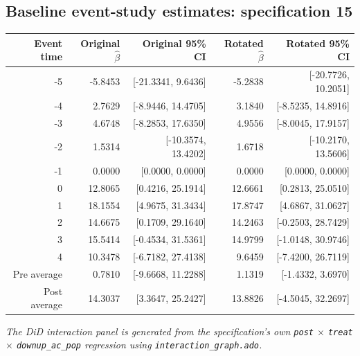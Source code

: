 \documentclass[10pt]{article}
\begin{document}
\subsection*{Baseline event-study estimates: specification 15}
\begin{center}
\scriptsize
\begin{tabular}{r rr rr}
\toprule
Event time & Original $\hat\beta$ & Original 95\% CI & Rotated $\hat\beta$ & Rotated 95\% CI \\
\midrule
-5 & -5.8453 & [-21.3341, 9.6436] & -5.2838 & [-20.7726, 10.2051] \\
-4 & 2.7629 & [-8.9446, 14.4705] & 3.1840 & [-8.5235, 14.8916] \\
-3 & 4.6748 & [-8.2853, 17.6350] & 4.9556 & [-8.0045, 17.9157] \\
-2 & 1.5314 & [-10.3574, 13.4202] & 1.6718 & [-10.2170, 13.5606] \\
-1 & 0.0000 & [0.0000, 0.0000] & 0.0000 & [0.0000, 0.0000] \\
0 & 12.8065 & [0.4216, 25.1914] & 12.6661 & [0.2813, 25.0510] \\
1 & 18.1554 & [4.9675, 31.3434] & 17.8747 & [4.6867, 31.0627] \\
2 & 14.6675 & [0.1709, 29.1640] & 14.2463 & [-0.2503, 28.7429] \\
3 & 15.5414 & [-0.4534, 31.5361] & 14.9799 & [-1.0148, 30.9746] \\
4 & 10.3478 & [-6.7182, 27.4138] & 9.6459 & [-7.4200, 26.7119] \\
\midrule
Pre average & 0.7810 & [-9.6668, 11.2288] & 1.1319 & [-1.4332, 3.6970] \\
Post average & 14.3037 & [3.3647, 25.2427] & 13.8826 & [-4.5045, 32.2697] \\
\bottomrule
\end{tabular}
\end{center}
\medskip
\textit{The DiD interaction panel is generated from the specification's own \texttt{post} $\times$ \texttt{treat} $\times$ \texttt{downup\_ac\_pop} regression using \texttt{interaction\_graph.ado}.}
\clearpage
\end{document}
